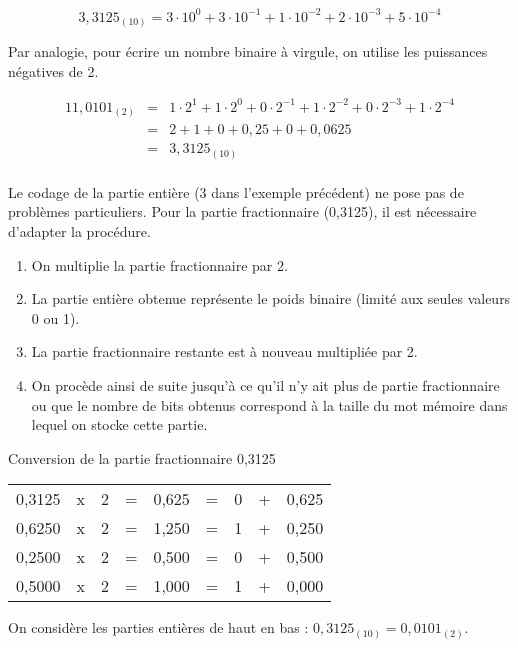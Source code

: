 \begin{exemple}
$$
3,3125_{ (10)}	=	3\cdot 10^0 + 3\cdot10^{- 1} + 1\cdot10^{- 2} + 2\cdot10^{ -3} + 5\cdot10^{ -4}
$$
\end{exemple}

Par analogie, pour écrire un nombre binaire à virgule, on utilise les puissances négatives de 2.

\begin{exemple}
\begin{eqnarray*}
11,0101_{(2)} &=&	1\cdot 2^{1} + 1\cdot 2^{0} + 0\cdot 2^{-1} + 1\cdot 2^{- 2} + 0\cdot 2^{-3} + 1\cdot 2^{- 4}\\
		 &=&    2   +   1   +    0    +   0,25  +     0     +   0,0625\\
		 &=&   3,3125_{(10)}\\
\end{eqnarray*}
\vspace{-1cm}
\end{exemple}


Le codage de la partie entière (3 dans l’exemple précédent) ne pose pas de problèmes particuliers. Pour la partie fractionnaire (0,3125), il est nécessaire d’adapter la procédure.

\begin{methode}

\begin{enumerate}
\item On multiplie la partie fractionnaire par 2. 
\item La partie entière obtenue représente le poids binaire (limité aux seules valeurs 0 ou 1). 
\item La partie fractionnaire restante est à nouveau multipliée par 2.
\item On procède ainsi de suite jusqu’à ce qu’il n’y ait plus de partie fractionnaire ou que le nombre de bits obtenus correspond à la taille du mot mémoire dans lequel on stocke cette partie.
\end{enumerate}
\end{methode}


\begin{exemple}
Conversion de la partie fractionnaire 0,3125

\begin{center}
\begin{tabular}{cccccc|c|cc}
\cline{7-7}
0,3125 & x & 2 & = & 0,625 & = & 0 & + & 0,625 \\
0,6250 & x & 2 & = & 1,250 & = & 1 & + & 0,250 \\
0,2500 & x & 2 & = & 0,500 & = & 0 & + & 0,500 \\
0,5000 & x & 2 & = & 1,000 & = & 1 & + & 0,000 \\
\cline{7-7}
\end{tabular}
\end{center}
On considère les parties entières de haut en bas :
$0,3125_{(10)}=0,0101_{(2)}$.
\end{exemple}

